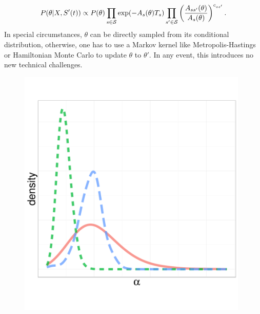 \begin{align}
  \label{eq:param_cond}
  P(\theta|X,S'(t)) \propto P(\theta) \prod_{s \in {\mathcal S}} \exp(-A_s(\theta)T_s) 
  \prod_{s' \in {\mathcal S}} \left(\frac{A_{ss'}(\theta)}{A_s(\theta)}\right)^{c_{ss'}}.
\end{align}
In special circumstances, $\theta$ can be directly sampled from its 
conditional distribution, otherwise, one has to use a Markov kernel like
Metropolis-Hastings or Hamiltonian Monte Carlo to update $\theta$ to 
$\theta'$. In any event, this introduces no new technical challenges.
  \begin{figure}%
  \centering
  \begin{minipage}[hp]{0.35\linewidth}
  \centering
    \vspace{-0 in}
    \includegraphics [width=0.98\textwidth, angle=0]{figs/dist_beta.pdf}
  \end{minipage}

\end{figure}
